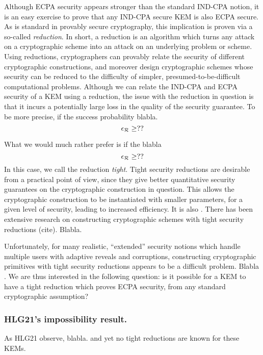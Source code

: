 Although ECPA security appears stronger than the standard IND-CPA notion,
it is an easy exercise to prove that any IND-CPA secure KEM is also ECPA secure.
As is standard in provably secure cryptography, this implication is proven via a so-called \emph{reduction}.
In short, a reduction is an algorithm which turns any attack on a cryptographic scheme
into an attack on an underlying problem or scheme.
Using reductions,
cryptographers can provably relate the security of different cryptographic constructions,
and moreover design cryptographic schemes
whose security can be reduced to the difficulty of simpler,
presumed-to-be-difficult computational problems.
Although we can relate the IND-CPA and ECPA security of a KEM using a reduction,
the issue with the reduction in question is that it incurs a potentially large loss
in the quality of the security guarantee. To be more precise,
if the success probability blabla.
\[
  \epsilon_{\redR} \ge ??
\]

What we would much rather prefer is if the blabla
\[
  \epsilon_{\redR} \ge ??
\]
In this case, we call the reduction \emph{tight}.
Tight security reductions are desirable from a practical point of view,
since they give better quantitative security guarantees on the cryptographic construction in question.
This allows the cryptographic construction to be instantiated with smaller parameters, for a given level of security,
leading to increased efficiency.
It is also .
There has been extensive research on constructing cryptographic schemes with tight security reductions (cite).
Blabla.

Unfortunately,
for many realistic, ``extended'' security notions which handle multiple users with adaptive reveals and corruptions,
constructing cryptographic primitives with tight security reductions appears to be a difficult problem.
Blabla .
We are thus interested in the following question: is it possible for a KEM to have a tight reduction
which proves ECPA security, from any standard cryptographic assumption?

\subsubsection{HLG21's impossibility result.}

As HLG21 observe, blabla.
and yet no tight reductions are known for these KEMs.

